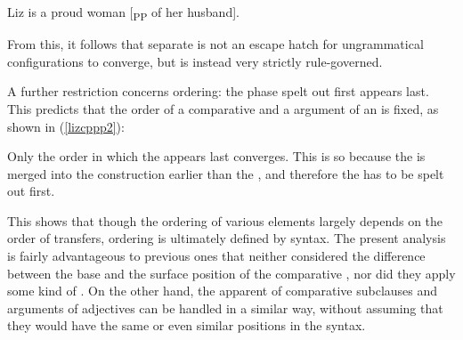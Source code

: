 \ea *Liz is a proud woman [\textsubscript{PP} of her husband]. \label{ppunchecked}
\z

From this, it follows that separate  is not an escape hatch for ungrammatical configurations to converge, but is instead very strictly rule-governed.

A further restriction concerns ordering: the phase spelt out first appears last. This predicts that the order of a comparative  and a  argument of an  is fixed, as shown in (\ref{lizcppp2}):

\ea \label{lizcppp2}
\z
\z

Only the order in which the  appears last converges. This is so because the  is merged into the construction earlier than the , and therefore the  has to be spelt out first.

This shows that though the ordering of various elements largely depends on the order of  transfers,  ordering is ultimately defined by syntax. The present analysis is fairly advantageous to previous ones that neither considered the difference between the base and the surface position of the comparative , nor did they apply some kind of . On the other hand, the apparent  of comparative subclauses and  arguments of adjectives can be handled in a similar way, without assuming that they would have the same or even similar positions in the syntax.
